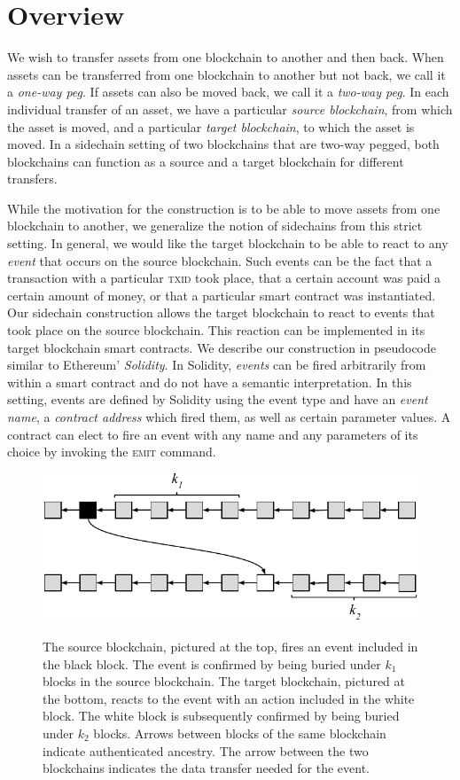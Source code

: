 \section{Overview}
We wish to transfer assets from one blockchain to another and then back. When
assets can be transferred from one blockchain to another but not back, we call
it a \emph{one-way peg}. If assets can also be moved back, we call it a
\emph{two-way peg}. In each individual transfer of an asset, we have a
particular \emph{source blockchain}, from which the asset is moved, and a
particular \emph{target blockchain}, to which the asset is moved. In a sidechain
setting of two blockchains that are two-way pegged, both blockchains can
function as a source and a target blockchain for different transfers.

While the motivation for the construction is to be able to move assets from one
blockchain to another, we generalize the notion of sidechains from this strict
setting. In general, we would like the target blockchain to be able to react to
any \emph{event} that occurs on the source blockchain. Such events can be the
fact that a transaction with a particular \textsc{txid} took place, that a
certain account was paid a certain amount of money, or that a particular smart
contract was instantiated. Our sidechain construction allows the target
blockchain to react to events that took place on the source blockchain. This
reaction can be implemented in its target blockchain smart contracts. We
describe our construction in pseudocode similar to Ethereum' \emph{Solidity}. In
Solidity, \emph{events} can be fired arbitrarily from within a smart contract
and do not have a semantic interpretation. In this setting, events are defined
by Solidity using the \textsf{event} type and have an \emph{event name}, a
\emph{contract address} which fired them, as well as certain parameter values. A
contract can elect to fire an event with any name and any parameters of its
choice by invoking the \textsc{emit} command.

\begin{figure}
    \caption{The source blockchain, pictured at the top, fires an event
             included in the black block. The event is confirmed by being buried
             under $k_1$ blocks in the source blockchain. The target blockchain,
             pictured at the bottom, reacts to the event with an action included
             in the white block. The white block is subsequently confirmed by
             being buried under $k_2$ blocks. Arrows between blocks of the same
             blockchain indicate authenticated ancestry. The arrow between the
             two blockchains indicates the data transfer needed for the event.}
    \centering
    \includegraphics[width=0.7 \columnwidth,keepaspectratio]{figures/events.pdf}
    \label{fig.events}
\end{figure}

